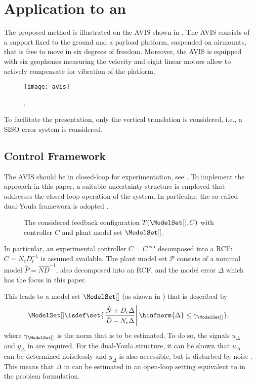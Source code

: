 \section{Application to an }
\label{sec:measurement}
The proposed method is illustrated on the \gls{AVIS} shown in .
The \gls{AVIS} consists of a support fixed to the ground and a payload platform, suspended on airmounts, that is free to move in six degrees of freedom.
Moreover, the \gls{AVIS} is equipped with six geophones measuring the velocity and eight linear motors allow to actively compensate for vibration of the platform.

\begin{figure}
  \centering
  \texttt{[image: avis]}
  \caption{.}
  \label{fig:avis}
\end{figure}

To facilitate the presentation, only the vertical translation is considered, i.e., a \gls{SISO} error system is considered.

\subsection{Control Framework}
\label{sec:control}
The \gls{AVIS} should be in closed-loop for experimentation, see . 
To implement the approach in this paper, a suitable uncertainty structure is employed that addresses the closed-loop operation of the system. 
In particular, the so-called dual-Youla framework is adopted \citep{Hansen1989,Anderson1998}. 

\begin{figure}
 \centering
 
 \caption{The considered feedback configuration $T(\ModelSet[],C)$ with controller $C$ and plant model set $\ModelSet[]$.}
 \label{fig:tpc}
\end{figure}

In particular, an experimental controller $C = C^{\mathrm{exp}} $ decomposed into a \gls{RCF}: $C = N_c D_c^{-1} $ is assumed available.
The plant model set $\mathcal{P}$ consists of a nominal model $\hat{P} = \hat{N} \hat{D}^{-1}$, also decomposed into an \gls{RCF}, and the model error $\Delta$ which has the focus in this paper. 

This leads to a model set $\ModelSet[]$ (as shown in ) that is described by
\begin{equation}
  \ModelSet[] \isdef \set{\left. \frac{\hat{N} + D_c \Delta}{\hat{D} - N_c \Delta} \right| \hinfnorm{\Delta} \leq \gamma_{\ModelSet[]}  }
  \label{eq:dualYoulaModelSet}
  \text{,}
\end{equation}
where $\gamma_{\ModelSet[]}$ is the \Hinf{} norm that is to be estimated.
To do so, the signals $u_{\Delta}$ and $y_{\Delta}$ in  are required.
For the dual-Youla structure, it can be shown that $u_{\Delta}$ can be determined noiselessly and $y_{\Delta}$ is also accessible, but is disturbed by noise \citep{Anderson1998}.
This means that $\Delta$ in  can be estimated in an open-loop setting equivalent to  in the problem formulation.

